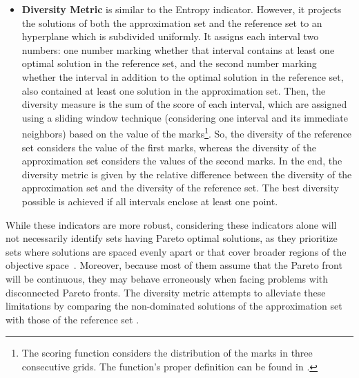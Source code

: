 \begin{itemize}
		\item \textbf{Diversity Metric} is similar to the Entropy indicator. However, it projects the solutions of both the approximation set and the reference set to an hyperplane which is subdivided uniformly. It assigns each interval two numbers: one number marking whether that interval contains at least one optimal solution in the reference set, and the second number marking whether the interval in addition to the optimal solution in the reference set, also contained at least one solution in the approximation set. Then, the diversity measure is the sum of the score of each interval, which are assigned using a sliding window technique (considering one interval and its immediate neighbors) based on the value of the marks\footnote{The scoring function considers the distribution of the marks in three consecutive grids. The function's proper definition can be found in \cite{Deb2002DM}.}. So, the diversity of the reference set considers the value of the first marks, whereas the diversity of the approximation set considers the values of the second marks. In the end, the diversity metric is given by the relative difference between the diversity of the approximation set and the diversity of the reference set. The best diversity possible is achieved if all intervals enclose at least one point\cite{Deb2002DM}.
		
	\end{itemize}
	
	While these indicators are more robust, considering these indicators alone will not necessarily identify sets having Pareto optimal solutions, as they prioritize sets where solutions are spaced evenly apart or that cover broader regions of the objective space~\cite{Veldhuizen1999GD}. Moreover, because most of them assume that the Pareto front will be continuous, they may behave erroneously when facing problems with disconnected Pareto fronts. The diversity metric attempts to alleviate these limitations by comparing the non-dominated solutions of the approximation set with those of the reference set \cite{Deb2002DM}.
	
